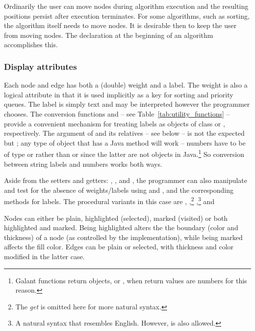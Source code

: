 Ordinarily the user can move nodes during algorithm execution
and the resulting positions persist after execution terminates.
For some algorithms, such as sorting, the algorithm itself needs to move
nodes.
It is desirable then to keep the user from moving nodes.
The declaration  at the beginning of an algorithm
accomplishes this.

\subsubsection{Display attributes} \label{sec:display_attributes}

Each node and edge has
both a (double) weight and a label.
The weight
is also a logical
attribute in that
it is used implicitly as a
key for
sorting and priority queues.
The label is simply text and may be interpreted however the programmer
chooses.
The conversion functions 
and 
-- see Table~\ref{tab:utility_functions}
-- provide a convenient mechanism for treating labels as objects of class
 or , respectively.
The argument of  and its relatives -- see below
-- is not the expected 
but ;
any type of object that has a Java  method will work
-- numbers have to be of type  or 
rather than  or  since the latter are not objects
in Java.\footnote{
  Galant functions return objects,  or , when
  return values are numbers for this reason.
}
So conversion between string labels and numbers works both ways.

Aside from the setters and getters: ,
\mbox{}, 
and \mbox{}, the programmer can also
manipulate and test for the absence of weights/labels using
 and ,
and the corresponding methods for labels.
The procedural variants in this case are
,
\mbox{},\footnote{
  The \emph{get} is omitted here for more natural syntax.}
,\footnote{
  A natural syntax that resembles English. However,
   is also allowed.
}
and \mbox{}

Nodes can either be plain, highlighted (selected), marked (visited) or both highlighted and
marked.
Being highlighted alters the
the boundary (color and thickness) of a node (as controlled by the
implementation), while being marked affects the fill color.
Edges can be plain or selected, with thickness and color modified in the
latter case.

